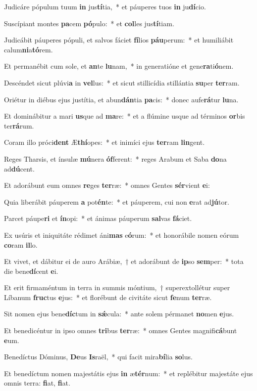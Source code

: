 \item Judicáre pópulum tuum \textbf{in} jus\textbf{tí}tia,~* et páuperes tuos \textbf{in} ju\textbf{dí}cio.
\item Suscípiant montes \textbf{pa}cem \textbf{pó}pulo:~* et \textbf{col}les jus\textbf{tí}tiam.
\item Judicábit páuperes pópuli, et salvos fáciet \textbf{fí}lios \textbf{páu}perum:~* et humiliábit calum\textbf{ni}a\textbf{tó}rem.
\item Et permanébit cum sole, et \textbf{an}te \textbf{lu}nam,~* in generatióne et gene\textbf{ra}ti\textbf{ó}nem.
\item Descéndet sicut plúvi\textbf{a} in \textbf{vel}lus:~* et sicut stillicídia stillántia \textbf{su}per \textbf{ter}ram.
\item Oriétur in diébus ejus justítia, et abun\textbf{dán}tia \textbf{pa}cis:~* donec aufe\textbf{rá}tur \textbf{lu}na.
\item Et dominábitur a mari \textbf{us}que ad \textbf{ma}re:~* et a flúmine usque ad términos \textbf{or}bis ter\textbf{rá}rum.
\item Coram illo próci\textbf{dent} Æ\textbf{thí}opes:~* et inimíci ejus \textbf{ter}ram \textbf{lin}gent.
\item Reges Tharsis, et ínsulæ \textbf{mú}nera \textbf{óf}ferent:~* reges Arabum et Saba \textbf{do}na ad\textbf{dú}cent.
\item Et adorábunt eum omnes \textbf{re}ges \textbf{ter}ræ:~* omnes Gentes \textbf{sér}vient \textbf{e}i:
\item Quia liberábit páuperem \textbf{a} pot\textbf{én}te:~* et páuperem, cui non \textbf{e}rat ad\textbf{jú}tor.
\item Parcet páupe\textbf{ri} et \textbf{ín}opi:~* et ánimas páuperum \textbf{sal}vas \textbf{fá}ciet.
\item Ex usúris et iniquitáte rédimet áni\textbf{mas} e\textbf{ó}rum:~* et honorábile nomen eórum \textbf{co}ram \textbf{il}lo.
\item Et vivet, et dábitur ei de auro Arábiæ,~† et adorábunt de \textbf{ip}so \textbf{sem}per:~* tota die bene\textbf{dí}cent \textbf{e}i.
\item Et erit firmaméntum in terra in summis móntium,~† superextollétur super Líbanum \textbf{fruc}tus \textbf{e}jus:~* et florébunt de civitáte sicut \textbf{fe}num \textbf{ter}ræ.
\item Sit nomen ejus bene\textbf{díc}tum in \textbf{sǽ}cula:~* ante solem pérmanet \textbf{no}men \textbf{e}jus.
\item Et benedicéntur in ipso omnes \textbf{tri}bus \textbf{ter}ræ:~* omnes Gentes magnifi\textbf{cá}bunt \textbf{e}um.
\item Benedíctus Dóminus, \textbf{De}us \textbf{Is}raël,~* qui facit mira\textbf{bí}lia \textbf{so}lus.
\item Et benedíctum nomen majestátis ejus \textbf{in} æ\textbf{tér}num:~* et replébitur majestáte ejus omnis terra: \textbf{fi}at, \textbf{fi}at.
